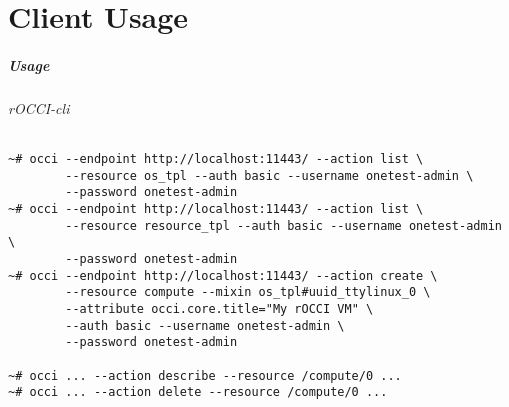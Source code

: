 \part{Client Usage}

\begin{frame}[fragile]
  \frametitle{Usage}
  \framesubtitle{rOCCI-cli}

  \begin{Sbox}
  \Fontsmaller
  \begin{minipage}{\linewidth-2\fboxsep-2\fboxrule-4pt}
  \color{white}
  \begin{verbatim}
~# occi --endpoint http://localhost:11443/ --action list \
        --resource os_tpl --auth basic --username onetest-admin \
        --password onetest-admin
~# occi --endpoint http://localhost:11443/ --action list \
        --resource resource_tpl --auth basic --username onetest-admin \
        --password onetest-admin
~# occi --endpoint http://localhost:11443/ --action create \
        --resource compute --mixin os_tpl#uuid_ttylinux_0 \
        --attribute occi.core.title="My rOCCI VM" \
        --auth basic --username onetest-admin \
        --password onetest-admin

~# occi ... --action describe --resource /compute/0 ...
~# occi ... --action delete --resource /compute/0 ...
  \end{verbatim}
  \end{minipage}
  \end{Sbox}
  \fcolorbox{black}{black}{\TheSbox}
\end{frame}
